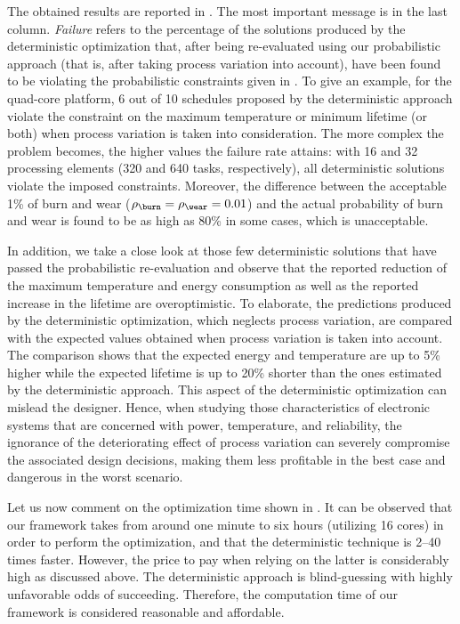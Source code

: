 The obtained results are reported in . The
most important message is in the last column. \emph{Failure} refers to the
percentage of the solutions produced by the deterministic optimization that,
after being re-evaluated using our probabilistic approach (that is, after taking
process variation into account), have been found to be violating the
probabilistic constraints given in . To
give an example, for the quad-core platform, 6 out of 10 schedules proposed by
the deterministic approach violate the constraint on the maximum temperature or
minimum lifetime (or both) when process variation is taken into consideration.
The more complex the problem becomes, the higher values the failure rate
attains: with 16 and 32 processing elements (320 and 640 tasks, respectively),
all deterministic solutions violate the imposed constraints. Moreover, the
difference between the acceptable 1\% of burn and wear ($\rho_\burn = \rho_\wear
= 0.01$) and the actual probability of burn and wear is found to be as high as
80\% in some cases, which is unacceptable.

In addition, we take a close look at those few deterministic solutions that have
passed the probabilistic re-evaluation and observe that the reported reduction
of the maximum temperature and energy consumption as well as the reported
increase in the lifetime are overoptimistic. To elaborate, the predictions
produced by the deterministic optimization, which neglects process variation,
are compared with the expected values obtained when process variation is taken
into account. The comparison shows that the expected energy and temperature are
up to 5\% higher while the expected lifetime is up to 20\% shorter than the ones
estimated by the deterministic approach. This aspect of the deterministic
optimization can mislead the designer. Hence, when studying those
characteristics of electronic systems that are concerned with power,
temperature, and reliability, the ignorance of the deteriorating effect of
process variation can severely compromise the associated design decisions,
making them less profitable in the best case and dangerous in the worst
scenario.

Let us now comment on the optimization time shown in
. It can be observed that our framework takes
from around one minute to six hours (utilizing 16 cores) in order to perform the
optimization, and that the deterministic technique is 2--40 times faster.
However, the price to pay when relying on the latter is considerably high as
discussed above. The deterministic approach is blind-guessing with highly
unfavorable odds of succeeding. Therefore, the computation time of our framework
is considered reasonable and affordable.


